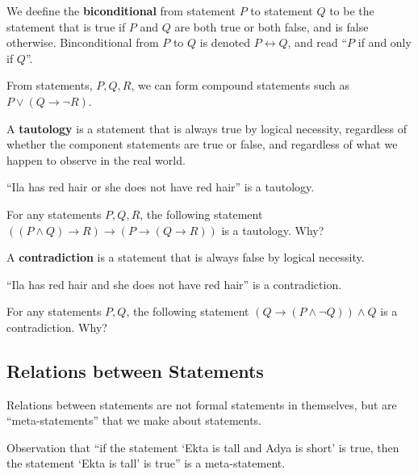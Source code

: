 \documentclass[]{article}
\begin{document}
\begin{defn}[Biconditional] We deefine the \textbf{biconditional} from statement $P$ to statement $Q$ to be the statement that is true if $P$ and $Q$ are both true or both false, and is false otherwise. Binconditional from $P$ to $Q$ is denoted $P \leftrightarrow Q$, and read ``$P$ if and only if $Q$''. 
\end{defn}
\begin{exmp} From statements, $P,Q,R$, we can form compound statements such as $P \vee (Q\rightarrow \neg R)$.
\end{exmp}		
\begin{defn}[Tautology] A \textbf{tautology} is a statement that is always true by logical necessity, regardless of whether the component statements are true or false, and regardless of what we happen to observe in the real world. 
\end{defn}	
\begin{exmp} ``Ila has red hair or she does not have red hair'' is a tautology.
\end{exmp}
\begin{exmp} For any statements $P,Q,R$, the following statement $((P \wedge Q)\rightarrow R) \rightarrow (P \rightarrow (Q \rightarrow R))$ is a tautology. Why?
\end{exmp}
\begin{defn}[Contradiction] A \textbf{contradiction} is a statement that is always false by logical necessity.  
\end{defn}
\begin{exmp} ``Ila has red hair and she does not have red hair'' is a contradiction.
\end{exmp}
\begin{exmp} For any statements $P,Q$, the following statement $(Q\rightarrow (P \wedge \neg Q))\wedge Q$ is a contradiction. Why?
\end{exmp}

\subsection{Relations between Statements}
Relations between statements are not formal statements in themselves, but are ``meta-statements'' that we make about statements. 
\begin{exmp} Observation that ``if the statement ‘Ekta is tall and Adya is short’ is true, then the statement ‘Ekta is tall’ is true'' is a meta-statement.
\end{exmp}
\end{document}
